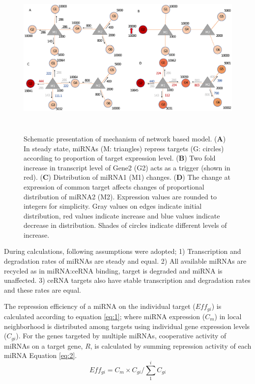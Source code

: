 \documentclass[a4,center,fleqn]{NAR}
\begin{document}
\begin{figure}[ht]
\begin{center}
\includegraphics[width=15cm,height=8cm]{fig1_new.eps}
\end{center}
\caption{Schematic presentation of mechanism of network based model. 
    (\textbf{A}) In steady state, miRNAs (M: triangles) repress targets (G: circles) according to proportion of target expression level. 
    (\textbf{B}) Two fold increase in transcript level of Gene2 (G2) acts as a trigger (shown in red). 
    (\textbf{C}) Distribution of miRNA1 (M1) changes. 
    (\textbf{D}) The change at expression of common target affects changes of proportional distribution of miRNA2 (M2). Expression values are rounded to integers for simplicity. Gray values on edges indicate initial distribution, red values indicate increase and blue values indicate decrease in distribution. Shades of circles indicate different levels of increase.}
\label{fig:fig1}
\end{figure}

During calculations, following assumptions were adopted; 1)
Transcription and degradation rates of miRNAs are steady and equal. 2)
All available miRNAs are recycled as in miRNA:ceRNA binding, target is
degraded and miRNA is unaffected. 3) ceRNA targets also have stable
transcription and degradation rates and these rates are equal.

The repression efficiency of a miRNA on the individual target
(\(Eff_{gi}\)) is calculated according to equation \eqref{eq:1}; where
miRNA expression (\(C_m\)) in local neighborhood is distributed among
targets using individual gene expression levels (\(C_{gi}\)). For the
genes targeted by multiple miRNAs, cooperative activity of miRNAs on a
target gene, \(R\), is calculated by summing repression activity of each
miRNA Equation \eqref{eq:2}. \begin{equation*} 
    Eff_{gi}= C_m \times C_{gi}/\sum_{1}^{i} C_{gi} \tag{1}\label{eq:1}
\end{equation*}
\end{document}
